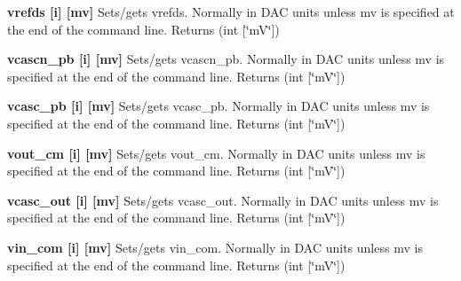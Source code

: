 \begin{DoxyItemize}
\item {\bfseries vrefds \mbox{[}i\mbox{]} \mbox{[}mv\mbox{]}} Sets/gets vrefds. Normally in DAC units unless {\ttfamily mv} is specified at the end of the command line. {\ttfamily Returns} {\ttfamily }(int \mbox{[}\char`\"{}mV\char`\"{}\mbox{]})
\end{DoxyItemize}


\begin{DoxyItemize}
\item {\bfseries vcascn\_\-pb \mbox{[}i\mbox{]} \mbox{[}mv\mbox{]}} Sets/gets vcascn\_\-pb. Normally in DAC units unless {\ttfamily mv} is specified at the end of the command line. {\ttfamily Returns} {\ttfamily }(int \mbox{[}\char`\"{}mV\char`\"{}\mbox{]})
\end{DoxyItemize}


\begin{DoxyItemize}
\item {\bfseries vcasc\_\-pb \mbox{[}i\mbox{]} \mbox{[}mv\mbox{]}} Sets/gets vcasc\_\-pb. Normally in DAC units unless {\ttfamily mv} is specified at the end of the command line. {\ttfamily Returns} {\ttfamily }(int \mbox{[}\char`\"{}mV\char`\"{}\mbox{]})
\end{DoxyItemize}


\begin{DoxyItemize}
\item {\bfseries vout\_\-cm \mbox{[}i\mbox{]} \mbox{[}mv\mbox{]}} Sets/gets vout\_\-cm. Normally in DAC units unless {\ttfamily mv} is specified at the end of the command line. {\ttfamily Returns} {\ttfamily }(int \mbox{[}\char`\"{}mV\char`\"{}\mbox{]})
\end{DoxyItemize}


\begin{DoxyItemize}
\item {\bfseries vcasc\_\-out \mbox{[}i\mbox{]} \mbox{[}mv\mbox{]}} Sets/gets vcasc\_\-out. Normally in DAC units unless {\ttfamily mv} is specified at the end of the command line. {\ttfamily Returns} {\ttfamily }(int \mbox{[}\char`\"{}mV\char`\"{}\mbox{]})
\end{DoxyItemize}


\begin{DoxyItemize}
\item {\bfseries vin\_\-com \mbox{[}i\mbox{]} \mbox{[}mv\mbox{]}} Sets/gets vin\_\-com. Normally in DAC units unless {\ttfamily mv} is specified at the end of the command line. {\ttfamily Returns} {\ttfamily }(int \mbox{[}\char`\"{}mV\char`\"{}\mbox{]})
\end{DoxyItemize}


